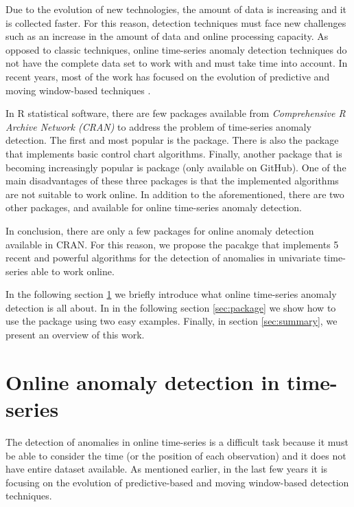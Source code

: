 \documentclass[a4paper]{article}\usepackage[]{graphicx}\usepackage[]{color}
\begin{document}
Due to the evolution of new technologies, the amount of data is increasing and it is collected faster. For this reason, detection techniques must face new challenges such as an increase in the amount of data and online processing capacity. As opposed to classic techniques, online time-series anomaly detection techniques do not have the complete data set to work with and must take time into account. In recent years, most of the work has focused on the evolution of predictive and moving window-based techniques  \cite{a3e0f1cf080343d98cae7430cd6e43c4}.

In R statistical software, there are few packages available from \emph{Comprehensive R Archive Network (CRAN)} to address the problem of time-series anomaly detection. The first and most popular is the  package. There is also the  package that implements basic control chart algorithms. Finally, another package that is becoming increasingly popular is  package (only available on GitHub). One of the main disadvantages of these three packages is that the implemented algorithms are not suitable to work online. In addition to the aforementioned, there are two other packages,  and  available for online time-series anomaly detection.

In conclusion, there are only a few packages for online anomaly detection available in CRAN. For this reason, we propose the  pacakge that implements 5 recent and powerful algorithms for the detection of anomalies in univariate time-series able to work online.

In the following section \ref{sec:online} we briefly introduce what online time-series anomaly detection is all about. In in the following section \ref{sec:package} we show how to use the  package using two easy examples. Finally, in section \ref{sec:summary}, we present an overview of this work.

\section{Online anomaly detection in time-series}\label{sec:online}

The detection of anomalies in online time-series is a difficult task because it must be able to consider the time (or the position of each observation) and it does not have entire dataset available. As mentioned earlier, in the last few years it is focusing on the evolution of predictive-based and moving window-based detection techniques.
\end{document}
